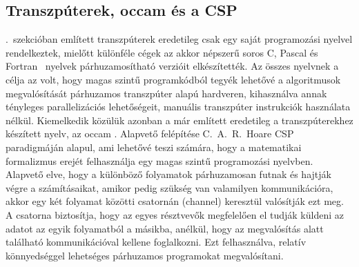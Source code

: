 %
%

\subsection{Transzpúterek, occam és a CSP}

.~szekcióban említett transzpúterek eredetileg csak egy saját programozási nyelvel rendelkeztek, mielőtt különféle cégek az akkor népszerű soros C, Pascal és Fortran~\cite{hey_supercomputing_1990} nyelvek párhuzamosítható verzióit elkészítették.
Az összes nyelvnek a célja az volt, hogy magas szintű programkódból tegyék lehetővé a algoritmusok megvalósítását párhuzamos transzpúter alapú hardveren, kihasználva annak tényleges parallelizációs lehetőségeit, manuális transzpúter instrukciók használata nélkül.
Kiemelkedik közülük azonban a már említett eredetileg a transzpúterekhez készített nyelv, az occam \cite{sgs-thomson_microelectronics_limited_occam_1995}.
Alapvető felépítése C.~A.~R.~Hoare CSP paradigmáján \cite{hoare_communicating_2004} alapul, ami lehetővé teszi számára, hogy a matematikai formalizmus erejét felhasználja egy magas szintű programozási nyelvben.
Alapvető elve, hogy a különböző folyamatok párhuzamosan futnak és hajtják végre a számításaikat, amikor pedig szükség van valamilyen kommunikációra, akkor egy két folyamat közötti csatornán (channel) keresztül valósítják ezt meg.
A csatorna biztosítja, hogy az egyes résztvevők megfelelően el tudják küldeni az adatot az egyik folyamatból a másikba, anélkül, hogy az megvalósítás alatt található kommunikációval kellene foglalkozni.
Ezt felhasználva, relatív könnyedséggel lehetséges párhuzamos programokat megvalósítani.

